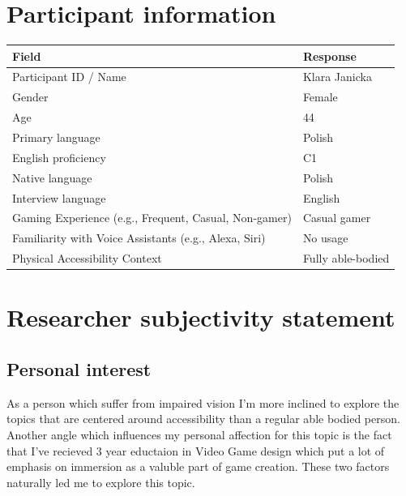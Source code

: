 \section{Participant information}
\begin{table}[h]
\centering
\begin{tabular}{|p{5cm}|p{10cm}|}
\hline
\textbf{Field} & \textbf{Response} \\ \hline
Participant ID / Name & Klara Janicka \\[1.5cm] \hline
Gender & Female \\[1.5cm] \hline
Age & 44 \\[1.5cm] \hline
Primary language & Polish \\[1.5cm] \hline
English proficiency & C1 \\[1.5cm] \hline
Native language & Polish \\[1.5cm] \hline
Interview language & English \\[1.5cm] \hline
Gaming Experience (e.g., Frequent, Casual, Non-gamer) & Casual gamer \\[1.5cm] \hline %
Familiarity with Voice Assistants (e.g., Alexa, Siri) & No usage  \\[1.5cm] \hline
Physical Accessibility Context & Fully able-bodied \\[2cm] \hline
\end{tabular}
\end{table}


\section{Researcher subjectivity statement}

\subsection{Personal interest}

    As a person which suffer from impaired vision I'm more inclined to explore the topics that are centered around accessibility than a regular able bodied person.
Another angle which influences my personal affection for this topic is the fact that I've recieved 3 year eductaion in Video Game design which put a lot of emphasis on immersion
as a valuble part of game creation. These two factors naturally led me to explore this topic.
